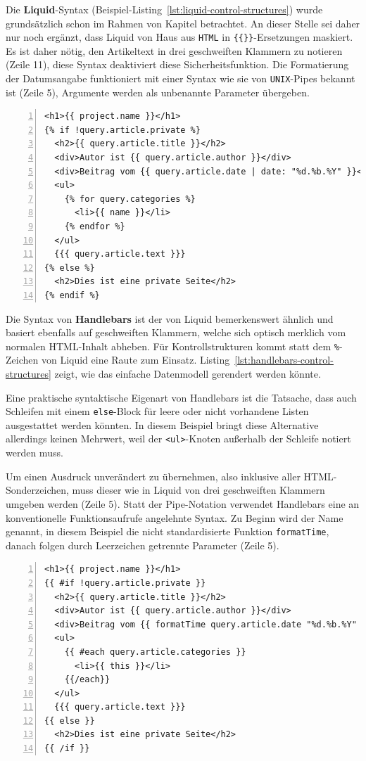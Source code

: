 Die \textbf{Liquid}-Syntax (Beispiel-Listing~\ref{lst:liquid-control-structures}) wurde grundsätzlich schon im Rahmen von Kapitel  betrachtet. An dieser Stelle sei daher nur noch ergänzt, dass Liquid von Haus aus \texttt{HTML} in \texttt{\{\{\}\}}-Ersetzungen maskiert. Es ist daher nötig, den Artikeltext in drei geschweiften Klammern zu notieren (Zeile 11), diese Syntax deaktiviert diese Sicherheitsfunktion. Die Formatierung der Datumsangabe funktioniert mit einer Syntax wie sie von \texttt{UNIX}-Pipes bekannt ist (Zeile 5), Argumente werden als unbenannte Parameter übergeben.

\begin{lstlisting}[float=h, numbers=left, caption={Blogartikel mit Liquid}, label={lst:liquid-control-structures}]
<h1>{{ project.name }}</h1>
{% if !query.article.private %}
  <h2>{{ query.article.title }}</h2>
  <div>Autor ist {{ query.article.author }}</div>
  <div>Beitrag vom {{ query.article.date | date: "%d.%b.%Y" }}</div>
  <ul>
    {% for query.categories %}
      <li>{{ name }}</li>
    {% endfor %}
  </ul>
  {{{ query.article.text }}}
{% else %}
  <h2>Dies ist eine private Seite</h2>
{% endif %}
\end{lstlisting}

Die Syntax von \textbf{Handlebars} ist der von Liquid bemerkenswert ähnlich und basiert ebenfalls auf geschweiften Klammern, welche sich optisch merklich vom normalen HTML-Inhalt abheben. Für Kontrollstrukturen kommt statt dem \texttt{\%}-Zeichen von Liquid eine Raute zum Einsatz. Listing~\ref{lst:handlebars-control-structures} zeigt, wie das einfache Datenmodell gerendert werden könnte.

Eine praktische syntaktische Eigenart von Handlebars ist die Tatsache, dass auch Schleifen mit einem \texttt{else}-Block für leere oder nicht vorhandene Listen ausgestattet werden könnten. In diesem Beispiel bringt diese Alternative allerdings keinen Mehrwert, weil der \texttt{<ul>}-Knoten außerhalb der Schleife notiert werden muss.

Um einen Ausdruck unverändert zu übernehmen, also inklusive aller HTML-Sonderzeichen, muss dieser wie in Liquid von drei geschweiften Klammern umgeben werden (Zeile 5). Statt der Pipe-Notation verwendet Handlebars eine an konventionelle Funktionsaufrufe angelehnte Syntax. Zu Beginn wird der Name genannt, in diesem Beispiel die nicht standardisierte Funktion \texttt{formatTime}, danach folgen durch Leerzeichen getrennte Parameter (Zeile 5).

\begin{lstlisting}[float=h, numbers=left, caption={Blogartikel mit Handlebars}, label={lst:handlebars-control-structures}]
<h1>{{ project.name }}</h1>
{{ #if !query.article.private }}
  <h2>{{ query.article.title }}</h2>
  <div>Autor ist {{ query.article.author }}</div>
  <div>Beitrag vom {{ formatTime query.article.date "%d.%b.%Y" }}</div>
  <ul>
    {{ #each query.article.categories }}
      <li>{{ this }}</li>
    {{/each}}
  </ul>
  {{{ query.article.text }}}
{{ else }}
  <h2>Dies ist eine private Seite</h2>
{{ /if }}
\end{lstlisting}

